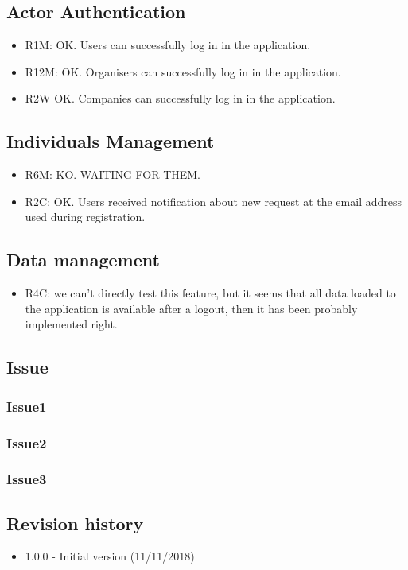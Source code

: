 \documentclass{article}
\begin{document}
\subsection{Actor Authentication}
\begin{itemize}
	\item R1M: OK. Users can successfully log in in the application.
	\item R12M: OK. Organisers can successfully log in in the application.
	\item R2W OK. Companies  can successfully log in in the application.
\end{itemize}

\subsection{Individuals Management}
\begin{itemize}
	\item R6M: KO. WAITING FOR THEM.
	\item R2C: OK. Users received notification about new request at the email address used during registration.
\end{itemize}

\subsection{Data management}
\begin{itemize}
	\item R4C: we can't directly test this feature, but it seems that all data loaded to the application is available after a logout, then it has been probably implemented right.
\end{itemize}

\subsection{Issue}
\subsubsection{Issue1}
\subsubsection{Issue2}
\subsubsection{Issue3}


\subsection{Revision history}
\begin{itemize}
	\item 1.0.0 - Initial version (11/11/2018)

\end{itemize}
\end{document}
